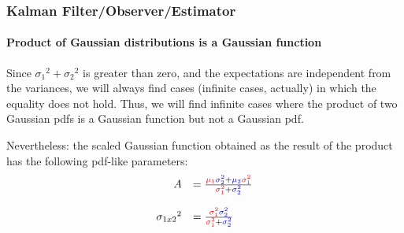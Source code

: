 \begin{frame}[plain]\pw\Large
\frametitle{Kalman Filter/Observer/Estimator}
\framesubtitle{Product of Gaussian distributions is a Gaussian function}

\scriptsize
Since ${ {\sigma_{1}}^{2} + {\sigma_{2}}^{2} }$ is greater than zero, and the expectations are independent from the variances, we will always find cases (infinite cases, actually) in which the equality does not hold. Thus, we will find infinite cases where the product of two Gaussian pdfs is a Gaussian function but not a Gaussian pdf.

Nevertheless: the scaled Gaussian function obtained as the result of the product has the following pdf-like parameters:
\begin{equation*}
\begin{array}{rlllllll}
A &= \frac { {\color{red}\mu_1} {\color{blue}\sigma^2_2} + {\color{blue}\mu_2} {\color{red}\sigma^2_1} }{ {\color{red}\sigma^2_1} + {\color{blue}\sigma^2_2}}\\\\
{\sigma_{1 x 2}}^2 &= \frac{{\color{red}\sigma^2_1} {\color{blue}\sigma^2_2}}{{\color{red}\sigma^2_1} + {\color{blue}\sigma^2_2}}
\end{array}
\end{equation*}

\end{frame}








%

